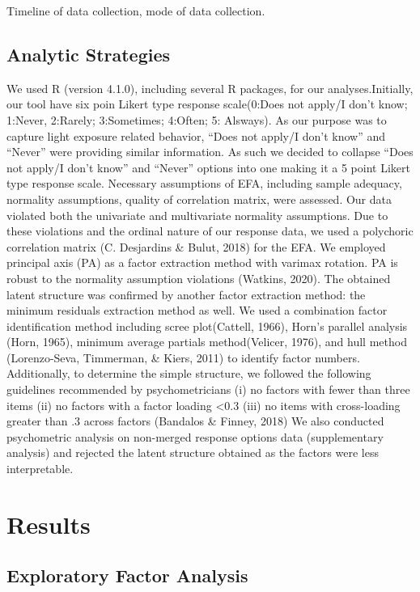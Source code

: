 \documentclass[
  english,
  man]{apa6}
\begin{document}
Timeline of data collection, mode of data collection.

\hypertarget{analytic-strategies}{%
\subsection{Analytic Strategies}\label{analytic-strategies}}

We used R (version 4.1.0), including several R packages, for our analyses.Initially, our tool have six poin Likert type response scale(0:Does not apply/I don't know; 1:Never, 2:Rarely; 3:Sometimes; 4:Often; 5: Alsways). As our purpose was to capture light exposure related behavior, ``Does not apply/I don't know'' and ``Never'' were providing similar information. As such we decided to collapse ``Does not apply/I don't know'' and ``Never'' options into one making it a 5 point Likert type response scale. Necessary assumptions of EFA, including sample adequacy, normality assumptions, quality of correlation matrix, were assessed. Our data violated both the univariate and multivariate normality assumptions. Due to these violations and the ordinal nature of our response data, we used a polychoric correlation matrix (C. Desjardins \& Bulut, 2018) for the EFA. We employed principal axis (PA) as a factor extraction method with varimax rotation. PA is robust to the normality assumption violations (Watkins, 2020). The obtained latent structure was confirmed by another factor extraction method: the minimum residuals extraction method as well. We used a combination factor identification method including scree plot(Cattell, 1966), Horn's parallel analysis (Horn, 1965), minimum average partials method(Velicer, 1976), and hull method (Lorenzo-Seva, Timmerman, \& Kiers, 2011) to identify factor numbers. Additionally, to determine the simple structure, we followed the following guidelines recommended by psychometricians (i) no factors with fewer than three items (ii) no factors with a factor loading \textless0.3 (iii) no items with cross-loading greater than .3 across factors (Bandalos \& Finney, 2018) We also conducted psychometric analysis on non-merged response options data (supplementary analysis) and rejected the latent structure obtained as the factors were less interpretable.

\hypertarget{results}{%
\section{Results}\label{results}}

\hypertarget{exploratory-factor-analysis}{%
\subsection{Exploratory Factor Analysis}\label{exploratory-factor-analysis}}
\end{document}
